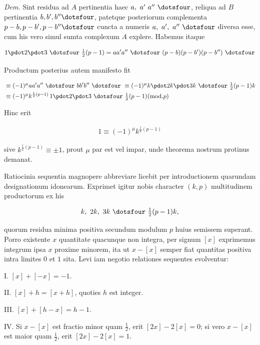 \emph{Dem.}  Sint residua ad $A$ pertinentia haec $a,\ a'\ a''\ \dotsfour$, reliqua ad $B$ pertinentia $b,b',b''\dotsfour$, patetque posteriorum complementa $p-b,p-b',p-b''\dotsfour$ cuncta a numeris $a,\ a',\ a''\ \dotsfour$ diversa esse, cum his vero simul sumta complexum $A$ explere.  Habemus itaque

\[
\begin{aligned}
1\pdot2\pdot3\ \dotsfour\ \tfrac12(p-1)=aa' a''\ \dotsfour\ (p-b)(p-b')(p-b'')\ \dotsfour
\end{aligned}
\]

Productum posterius autem manifesto fit

\[
\begin{aligned}
&\equiv(-1)^\mu aa' a''\ \dotsfour\ bb' b''\ \dotsfour\ \equiv(-1)^\mu k\pdot2k\pdot3k\ \dotsfour\ \tfrac12(p-1)k\\
&\equiv(-1)^\mu k^{\frac12(p-1)}\,1\pdot2\pdot3\ \dotsfour\ \tfrac12(p-1) (\mathrm{mod.}p)
\end{aligned}
\]

Hinc erit

\[
\begin{aligned}
1\equiv(-1)^\mu k^{\frac12(p-1)}
\end{aligned}
\]

sive $k^{\frac12(p-1)}\equiv\pm1$, prout $\mu$ par est vel impar, unde theorema nostrum protinus demanat.


Ratiocinia sequentia magnopere abbreviare licebit per introductionem quarundam designationum idonearum.  Exprimet igitur nobis character $(k,p)$ multitudinem productorum ex his

\[
\begin{aligned}
k,\ 2k,\ 3k\ \dotsfour\ \tfrac12(p-1)k,
\end{aligned}
\]

quorum residua minima positiva secundum modulum $p$ huius semissem superant. Porro existente $x$ quantitate quacunque non integra, per signum $[x]$ exprimemus integrum ipsa $x$ proxime minorem, ita ut $x-[x]$ semper fiat quantitas positiva intra limites $0$ et $1$ sita.  Levi iam negotio relationes sequentes evolventur:

I.  $[x]+[-x]=-1.$

II.  $[x]+h=[x+h]$, quoties $h$ est integer.

III.  $[x]+[h-x]=h-1.$

IV.  Si $x-[x]$ est fractio minor quam $\tfrac12$, erit $[2x]-2[x]=0$; si vero $x-[x]$ est maior quam $\tfrac12$, erit $[2x]-2[x]=1.$

